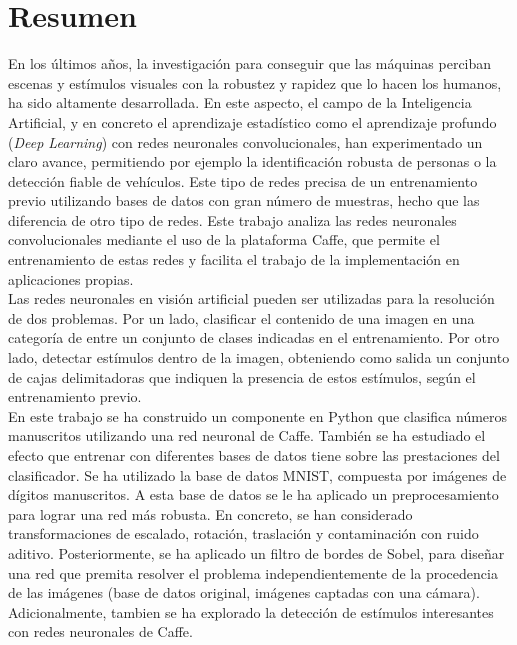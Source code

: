 \chapter*{Resumen}

En los últimos años, la investigación para conseguir que las máquinas perciban escenas y estímulos visuales con la robustez y rapidez que lo hacen los humanos, ha sido altamente desarrollada. En este aspecto, el campo de la Inteligencia Artificial, y en concreto el aprendizaje estadístico como el aprendizaje profundo (\textit{Deep Learning}) con redes neuronales convolucionales, han experimentado un claro avance, permitiendo por ejemplo la identificación robusta de personas o la detección fiable de vehículos. Este tipo de redes precisa de un entrenamiento previo utilizando bases de datos con gran número de muestras, hecho que las diferencia de otro tipo de redes. Este trabajo analiza las redes neuronales convolucionales mediante el uso de la plataforma Caffe, que permite el entrenamiento de estas redes y facilita el trabajo de la implementación en aplicaciones propias.\\

Las redes neuronales en visión artificial pueden ser utilizadas para la resolución de dos problemas. Por un lado, clasificar el contenido de una imagen en una categoría de entre un conjunto de clases indicadas en el entrenamiento. Por otro lado, detectar estímulos dentro de la imagen, obteniendo como salida un conjunto de cajas delimitadoras que indiquen la presencia de estos estímulos, según el entrenamiento previo.\\

En este trabajo se ha construido un componente en Python que clasifica números manuscritos utilizando una red neuronal de Caffe. También se ha estudiado el efecto que entrenar con diferentes bases de datos tiene sobre las prestaciones del clasificador. Se ha utilizado la base de datos MNIST, compuesta por imágenes de dígitos manuscritos. A esta base de datos se le ha aplicado un preprocesamiento para lograr una red más robusta. En concreto, se han considerado transformaciones de escalado, rotación, traslación y contaminación con ruido aditivo. Posteriormente, se ha aplicado un filtro de bordes de Sobel, para diseñar una red que premita resolver el problema independientemente de la procedencia de las imágenes (base de datos original, imágenes captadas con una cámara). Adicionalmente, tambien se ha explorado la detección de estímulos interesantes con redes neuronales de Caffe.
